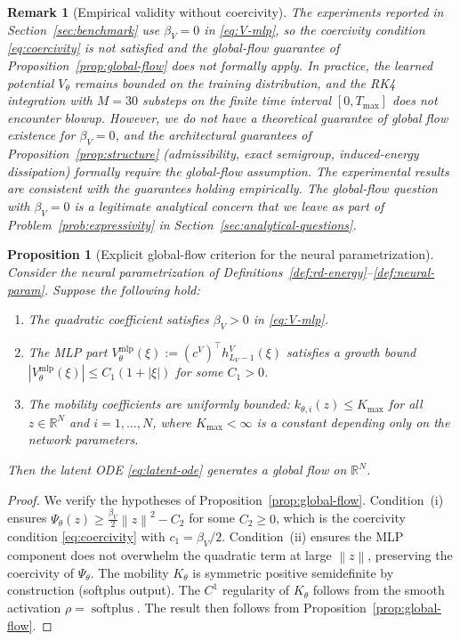 \documentclass[11pt]{article}
\newtheorem{remark}{Remark}
\newtheorem{proposition}{Proposition}
\newcommand{\R}{\mathbb{R}}
\newcommand{\softplus}{\operatorname{softplus}}
\newcommand{\norm}[1]{\left\lVert #1 \right\rVert}
\begin{document}
\begin{remark}[Empirical validity without coercivity]\label{rem:betaV-zero}
The experiments reported in Section~\ref{sec:benchmark} use $\beta_V=0$ in \eqref{eq:V-mlp}, so the coercivity condition \eqref{eq:coercivity} is not satisfied and the global-flow guarantee of Proposition~\ref{prop:global-flow} does not formally apply. In practice, the learned potential $V_{\theta}$ remains bounded on the training distribution, and the RK4 integration with $M=30$ substeps on the finite time interval $[0,T_{\max}]$ does not encounter blowup. However, we do not have a theoretical guarantee of global flow existence for $\beta_V=0$, and the architectural guarantees of Proposition~\ref{prop:structure} (admissibility, exact semigroup, induced-energy dissipation) formally require the global-flow assumption. The experimental results are consistent with the guarantees holding empirically. The global-flow question with $\beta_V=0$ is a legitimate analytical concern that we leave as part of Problem~\ref{prob:expressivity} in Section~\ref{sec:analytical-questions}.
\end{remark}

\begin{proposition}[Explicit global-flow criterion for the neural parametrization]\label{prop:explicit-global-flow}
Consider the neural parametrization of Definitions~\ref{def:rd-energy}--\ref{def:neural-param}. Suppose the following hold:
\begin{enumerate}[label=(\roman*)]
    \item The quadratic coefficient satisfies $\beta_V>0$ in \eqref{eq:V-mlp}.
    \item The MLP part $V_{\theta}^{\mathrm{mlp}}(\xi):=(c^V)^\top h_{L_V-1}^V(\xi)$ satisfies a growth bound $|V_{\theta}^{\mathrm{mlp}}(\xi)|\le C_1(1+|\xi|)$ for some $C_1>0$.
    \item The mobility coefficients are uniformly bounded: $k_{\theta,i}(z)\le K_{\max}$ for all $z\in \R^N$ and $i=1,\dots,N$, where $K_{\max}<\infty$ is a constant depending only on the network parameters.
\end{enumerate}
Then the latent ODE \eqref{eq:latent-ode} generates a global flow on $\R^N$.
\end{proposition}

\begin{proof}
We verify the hypotheses of Proposition~\ref{prop:global-flow}. Condition~(i) ensures $\Psi_{\theta}(z)\ge \frac{\beta_V}{2}\norm{z}^2 - C_2$ for some $C_2\ge 0$, which is the coercivity condition \eqref{eq:coercivity} with $c_1=\beta_V/2$. Condition~(ii) ensures the MLP component does not overwhelm the quadratic term at large $\norm{z}$, preserving the coercivity of $\Psi_{\theta}$. The mobility $K_{\theta}$ is symmetric positive semidefinite by construction (softplus output). The $C^1$ regularity of $K_{\theta}$ follows from the smooth activation $\rho=\softplus$. The result then follows from Proposition~\ref{prop:global-flow}.
\end{proof}
\end{document}
